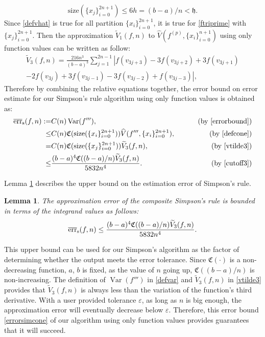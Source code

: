 \documentclass{iitthesis}
\DeclareMathOperator{\Var}{Var}
\newtheorem{lem}{Lemma}
\theoremstyle{definition}
\theoremstyle{remark}
\begin{document}
\begin{equation}\label{cutoff3}
    \text{size}(\{x_j\}_{i=0}^{2n+1})\leq 6h=(b-a)/n<\mathfrak{h}.
\end{equation}
Since \eqref{defvhat} is true for all partition $\{x_i\}_{i=0}^{2n+1}$, it is true for \eqref{ftriprime} with $\{x_j\}_{i=0}^{2n+1}$. Then the approximation $\widetilde{V}_1(f,n)$ to $\widehat{V}(f^{(p)},\{x_i\}_{i=0}^{n+1})$ using only function values can be written as follow:
\begin{multline}\label{vtilde3}
\widetilde{V}_3(f,n)=\frac{216n^3}{(b-a)^3}\sum_{j=1}^{2n-1}\left|f(v_{3j+3})-3f(v_{3j+2})+3f(v_{3j+1})\right.\\\left.-2f(v_{3j})+3f(v_{3j-1})-3f(v_{3j-2})+f(v_{3j-3})\right|,
\end{multline}
Therefore by combining the relative equations together, the error bound on error estimate for our Simpson's rule algorithm using only function values is obtained as:
\begin{align*}
\overline{\text{err}}_{\text{s}}(f,n):=&C(n)\Var(f'''),\qquad &\text{ (by \eqref{errorbound})}\\
\leq & C(n)\mathfrak{C}(\text{size}(\{x_i\}_{i=0}^{2n+1}))\widehat{V}(f''',\{x_i\}_{i=0}^{2n+1}), \qquad &\text{ (by \eqref{defcone})}\\
=& C(n)\mathfrak{C}(\text{size}(\{x_j\}_{i=0}^{2n+1}))\widetilde{V}_3(f,n), \qquad &\text{ (by \eqref{vtilde3})}\\
  \leq & \frac{(b-a)^4\mathfrak{C}((b-a)/n)\widetilde{V}_3(f,n)}{5832n^4}.\qquad &\text{ (by \eqref{cutoff3})}
\end{align*}

Lemma \ref{lemmaerrorboundsim} describes the upper bound on the estimation error of Simpson's rule.
\begin{lem}\label{lemmaerrorboundsim}
    The approximation error of the composite Simpson's rule is bounded in terms of the integrand values as follows:
    \begin{equation}\label{errorsimcone}
      \overline{\textup{err}}_{\text{s}}(f,n)\leq \frac{(b-a)^4\mathfrak{C}((b-a)/n)\widetilde{V}_3(f,n)}{5832n^4}.
    \end{equation}
\end{lem}


This upper bound can be used for our Simpson's algorithm as the factor of determining whether the output meets the error tolerance. Since $\mathfrak{C}(\cdot)$ is a non-decreasing function, $a$, $b$ is fixed, as the value of $n$ going up, $\mathfrak{C}((b-a)/n)$ is non-increasing. The definition of $\Var(f''')$ in \eqref{defvar} and $\widetilde{V}_3(f,n)$ in \eqref{vtilde3} provides that $\widetilde{V}_3(f,n)$ is always less than the variation of the function's third derivative. With a user provided tolerance $\varepsilon$, as long as $n$ is big enough, the approximation error will eventually decrease below $\varepsilon$.  Therefore, this error bound \eqref{errorsimcone} of our algorithm using only function values provides guarantees that it will succeed.
\end{document}
